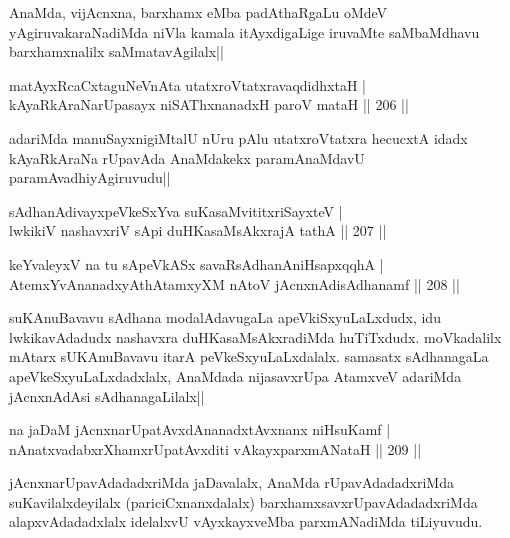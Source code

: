 \begin{artha}%
AnaMda, vijAcnxna, barxhamx eMba padAthaRgaLu oMdeV yAgiruvakaraNadiMda niVla kamala itAyxdigaLige iruvaMte saMbaMdhavu barxhamxnalilx saMmatavAgilalx||
\end{artha}

\begin{shl}
matAyxRcaCxtaguNeVnAta utatxroVtatxravaqdidhxtaH |\\
kAyaRkAraNarUpasayx niSAThx\s \s nanadxH paroV mataH \hfill || 206 ||
\end{shl}

\begin{artha}
adariMda manuSayxnigiMtalU nUru pAlu utatxroVtatxra hecucxtA idadx kAyaRkAraNa rUpavAda AnaMdakekx paramAnaMdavU paramAvadhiyAgiruvudu||
\end{artha}


\begin{shl}
sAdhanAdivayxpeVkeSxYva suKasaMvititxriSayxteV |\\
lwkikiV nashavxriV sA\s pi duHKasaMsAkxrajA tathA \hfill || 207 ||
\end{shl}

\begin{shl}
keYvaleyxV na tu sApeVkASx savaRsAdhanAniHsapxqqhA |\\
AtemxYvA\s \s nanadxyAthAtamxyXM nAtoV jAcnxnAdisAdhanamf \hfill || 208 ||
\end{shl}

\begin{artha}
suKAnuBavavu sAdhana modalAdavugaLa apeVkiSxyuLaLxdudx, idu lwkikavAdadudx nashavxra duHKasaMsAkxradiMda huTiTxdudx. moVkadalilx mAtarx sUKAnuBavavu itarA peVkeSxyuLaLxdalalx. samasatx sAdhanagaLa apeVkeSxyuLaLxdadxlalx, AnaMdada nijasavxrUpa AtamxveV adariMda jAcnxnAdAsi sAdhanagaLilalx||
\end{artha}

\begin{shl}
na jaDaM jAcnxnarUpatAvxdAnanadxtAvxnanx niHsuKamf |\\
nAnatxvadabxrXhamxrUpatAvxditi vAkayxparxmANataH \hfill || 209 ||
\end{shl}

\begin{artha}%
jAcnxnarUpavAdadadxriMda jaDavalalx, AnaMda rUpavAdadadxriMda suKavilalxdeyilalx (pariciCxnanxdalalx) barxhamxsavxrUpavAdadadxriMda alapxvAdadadxlalx idelalxvU vAyxkayxveMba parxmANadiMda tiLiyuvudu.
\end{artha}

